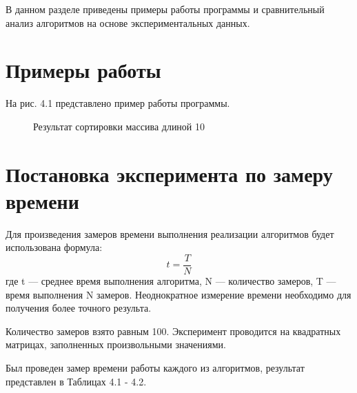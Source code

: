 \documentclass[12pt]{report}
\begin{document}
В данном разделе приведены примеры работы программы и сравнительный анализ алгоритмов на основе экспериментальных данных. 

\section{Примеры работы} 
 
На рис. 4.1 представлено пример работы программы. 

\begin{figure}[h]
	\caption{Результат сортировки массива длиной 10}
	\label{figure:image}
\end{figure}

\newpage
\section{Постановка эксперимента по замеру времени}

Для произведения замеров времени выполнения реализации алгоритмов будет использована формула: \begin{equation}\label{eq:fourierrow}
	t = \frac{T}{N}
\end{equation}
где t — среднее время выполнения алгоритма, N — количество замеров, T — время выполнения N замеров.  
Неоднократное измерение времени необходимо для получения более точного результа.  
 
 Количество замеров взято равным 100. Эксперимент проводится на квадратных матрицах, заполненных произвольными значениями.
 
 Был проведен замер времени работы каждого из алгоритмов, результат представлен в Таблицах 4.1 - 4.2. \vspace{\baselineskip}
 
\end{document}
